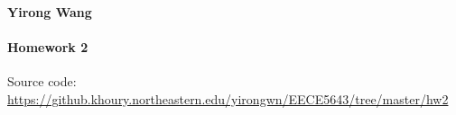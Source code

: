\documentclass[11pt]{article}
\theoremstyle{definition}
\begin{document}
\renewcommand{\labelenumii}{{\bfseries \em \arabic{enumi}.\arabic{enumii}}}
\newcommand{\problemitem}{\renewcommand{\labelenumi}{{\bfseries \em Problem \arabic{enumi}}}\item}
\newcommand{\solutionitem}{\renewcommand{\labelenumi}{{\bfseries \em Solution \arabic{enumi}}}\addtocounter{enumi}{-1}\item}
\newenvironment{solution}{\par\color{DarkBlue}}{\par}
{\noindent \textbf{Yirong Wang} }

\paragraph{Homework 2}


Source code: \url{https://github.khoury.northeastern.edu/yirongwn/EECE5643/tree/master/hw2}
\end{document}
